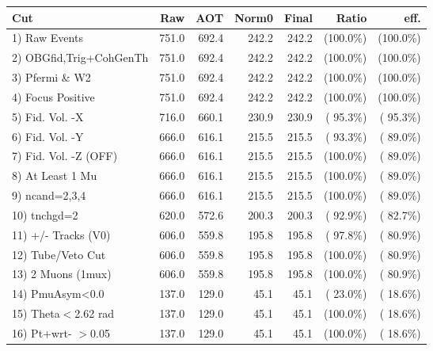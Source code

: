  \begin{table}[h!]\centering
 \begin{tabular}{||l||r|r|r|r|r|r||}
 \hline
 \hline
 Cut & Raw & AOT & Norm0 & Final & Ratio & eff.       \\
 \hline
  1) Raw Events           &        751.0 &        692.4 &        242.2 &        242.2 & (100.0\%) & (100.0\%) \\
  2) OBGfid,Trig+CohGenTh &        751.0 &        692.4 &        242.2 &        242.2 & (100.0\%) & (100.0\%) \\
  3) Pfermi \& W2         &        751.0 &        692.4 &        242.2 &        242.2 & (100.0\%) & (100.0\%) \\
  4) Focus Positive       &        751.0 &        692.4 &        242.2 &        242.2 & (100.0\%) & (100.0\%) \\
  5) Fid. Vol. -X         &        716.0 &        660.1 &        230.9 &        230.9 & ( 95.3\%) & ( 95.3\%) \\
  6) Fid. Vol. -Y         &        666.0 &        616.1 &        215.5 &        215.5 & ( 93.3\%) & ( 89.0\%) \\
  7) Fid. Vol. -Z (OFF)   &        666.0 &        616.1 &        215.5 &        215.5 & (100.0\%) & ( 89.0\%) \\
  8) At Least 1 Mu        &        666.0 &        616.1 &        215.5 &        215.5 & (100.0\%) & ( 89.0\%) \\
  9) ncand=2,3,4          &        666.0 &        616.1 &        215.5 &        215.5 & (100.0\%) & ( 89.0\%) \\
 10) tnchgd=2             &        620.0 &        572.6 &        200.3 &        200.3 & ( 92.9\%) & ( 82.7\%) \\
 11) +/- Tracks (V0)      &        606.0 &        559.8 &        195.8 &        195.8 & ( 97.8\%) & ( 80.9\%) \\
 12) Tube/Veto Cut        &        606.0 &        559.8 &        195.8 &        195.8 & (100.0\%) & ( 80.9\%) \\
 13) 2 Muons (1mux)       &        606.0 &        559.8 &        195.8 &        195.8 & (100.0\%) & ( 80.9\%) \\
 14) PmuAsym<0.0          &        137.0 &        129.0 &         45.1 &         45.1 & ( 23.0\%) & ( 18.6\%) \\
 15) Theta$<$2.62 rad     &        137.0 &        129.0 &         45.1 &         45.1 & (100.0\%) & ( 18.6\%) \\
 16) Pt+wrt- $>$0.05      &        137.0 &        129.0 &         45.1 &         45.1 & (100.0\%) & ( 18.6\%) \\

\end{tabular}
\end{table}
